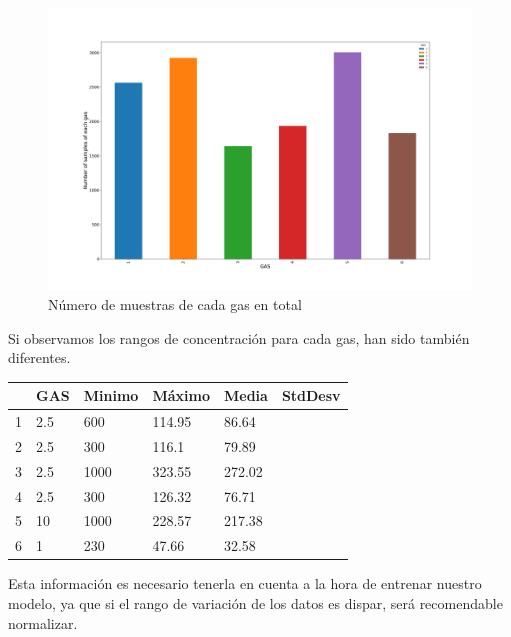 \begin{figure}[ht!]
	\centering
	\includegraphics[width=\columnwidth]{../py_imgs/Step0_Count_Gas.png}
	\caption{Número de muestras de cada gas en total}
	\label{fig: gasCount}
\end{figure}

Si observamos los rangos de concentración para cada gas, han sido también diferentes.

\begin{table}
    \centering
    \begin{tabular}{|l|l|l|l|l|l|}
    \hline
         & GAS & Minimo & Máximo & Media & StdDesv \\ \hline
        1 & 2.5 & 600 & 114.95 & 86.64 &  \\ \hline
        2 & 2.5 & 300 & 116.1 & 79.89 &  \\ \hline
        3 & 2.5 & 1000 & 323.55 & 272.02 &  \\ \hline
        4 & 2.5 & 300 & 126.32 & 76.71 &  \\ \hline
        5 & 10 & 1000 & 228.57 & 217.38 &  \\ \hline
        6 & 1 & 230 & 47.66 & 32.58 &  \\ \hline
    \end{tabular}
\end{table}

Esta información es necesario tenerla en cuenta a la hora de entrenar nuestro modelo, ya que
si el rango de variación de los datos es dispar, será recomendable normalizar.





